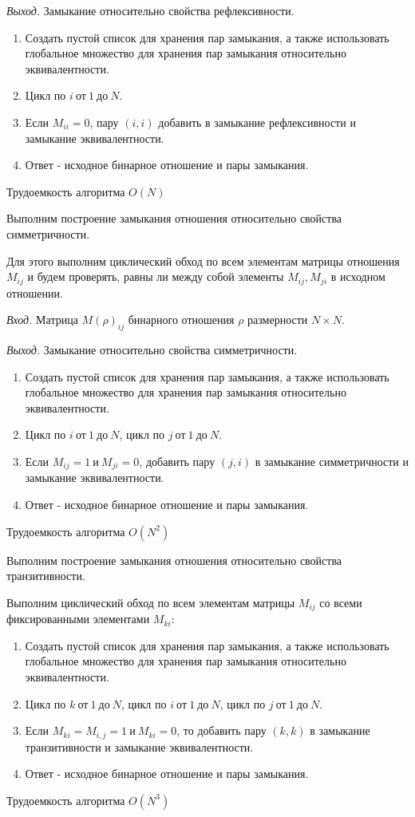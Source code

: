 \documentclass[bachelor, och, labwork]{shiza}
\begin{document}
\textit{Выход.} Замыкание относительно свойства рефлексивности.

\begin{enumerate}
    \item Создать пустой список для хранения пар замыкания, а также использовать
    глобальное множество для хранения пар замыкания относительно эквивалентности.
    \item Цикл по $i ~\text{от}~ 1 ~\text{до}~ N$.
    \item Если $M_{ii} = 0$, пару $(i, i)$ добавить в замыкание 
    рефлексивности и замыкание эквивалентности.    
    \item Ответ - исходное бинарное отношение и пары замыкания.
\end{enumerate}
Трудоемкость алгоритма $O(N)$

Выполним построение замыкания отношения относительно свойства 
симметричности.

Для этого выполним циклический обход по всем элементам матрицы 
отношения $M_{ij}$ и будем проверять, равны ли между собой элементы 
$M_{ij},M_{ji}$ в исходном отношении.

\textit{Вход.} Матрица $M(\rho)_{ij}$ бинарного отношения $\rho$ размерности
$N \times N$.

\textit{Выход.} Замыкание относительно свойства симметричности.

\begin{enumerate}
    \item Создать пустой список для хранения пар замыкания, а также использовать
    глобальное множество для хранения пар замыкания относительно эквивалентности.
    \item Цикл по $i ~\text{от}~ 1 ~\text{до}~ N$, цикл по $j ~\text{от}~ 1 ~\text{до}~ N$.
    \item Если $M_{ij} = 1 ~\text{и}~ M_{ji} = 0$, добавить пару $(j, i)$
    в замыкание симметричности и замыкание эквивалентности.
    \item Ответ - исходное бинарное отношение и пары замыкания.
\end{enumerate}
Трудоемкость алгоритма $O(N^2)$

Выполним построение замыкания отношения относительно свойства транзитивности.

Выполним циклический обход по всем элементам матрицы $M_{ij}$ со всеми
фиксированными элементами $M_{ki}$:

\begin{enumerate}
    \item Создать пустой список для хранения пар замыкания, а также использовать
    глобальное множество для хранения пар замыкания относительно эквивалентности.
    \item Цикл по $k ~\text{от}~ 1 ~\text{до}~ N$, цикл по $i ~\text{от}~ 1 ~\text{до}~ N$,
    цикл по $j ~\text{от}~ 1 ~\text{до}~ N$.
    \item Если $M_{ki}=M_{i,j}=1 ~\text{и}~ M_{ki}=0$, то добавить пару
    $(k, k)$ в замыкание транзитивности и замыкание эквивалентности.
    \item Ответ - исходное бинарное отношение и пары замыкания.
\end{enumerate}
Трудоемкость алгоритма $O(N^3)$
\end{document}
